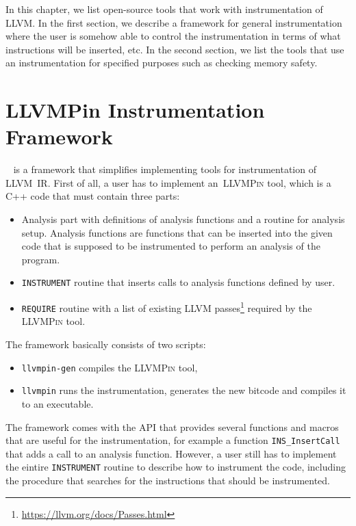 In this chapter, we list open-source tools that work with instrumentation of LLVM. In the
first section, we describe a framework for general instrumentation where the
user is somehow able to control the instrumentation in terms of what
instructions will be inserted, etc. In the second section, we list the tools
that use an instrumentation for specified purposes such as checking memory
safety.

\section{LLVMPin Instrumentation Framework}\label{sec:llvmpin}

\llvmpin~\cite{llvmpin} is a framework that simplifies implementing tools for
instrumentation of LLVM~IR. First of all, a user has to implement
an~\textsc{LLVMPin} tool, which is a C++ code that must contain three parts:

\begin{itemize}
    \item Analysis part with definitions of analysis functions and a routine
    for analysis setup. Analysis functions are functions that can be inserted
        into the given code that is supposed to be instrumented to perform an
        analysis of the program.
    \item \texttt{INSTRUMENT} routine that inserts calls to analysis functions
    defined by user.
    \item \texttt{REQUIRE} routine with a list of existing LLVM
    passes\footnote{\url{https://llvm.org/docs/Passes.html}} required
    by the \textsc{LLVMPin} tool.
\end{itemize}

The framework basically consists of two scripts:

\begin{itemize}
    \item \texttt{llvmpin-gen} compiles the \textsc{LLVMPin} tool,
    \item \texttt{llvmpin} runs the instrumentation, generates the new bitcode
    and compiles it to an executable.
\end{itemize}

The framework comes with the API that provides several functions and macros
that are useful for the instrumentation, for example a function
\texttt{INS\_InsertCall} that adds a call to an analysis function. However, a
user still has to implement the eintire \texttt{INSTRUMENT} routine to describe
how to instrument the code, including the procedure that searches for the
instructions that should be instrumented.

